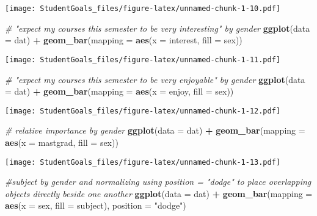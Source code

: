\documentclass[]{article}
\newenvironment{Shaded}{\begin{snugshade}}{\end{snugshade}}
\newcommand{\CommentTok}[1]{\textcolor[rgb]{0.56,0.35,0.01}{\textit{#1}}}
\newcommand{\DataTypeTok}[1]{\textcolor[rgb]{0.13,0.29,0.53}{#1}}
\newcommand{\KeywordTok}[1]{\textcolor[rgb]{0.13,0.29,0.53}{\textbf{#1}}}
\newcommand{\NormalTok}[1]{#1}
\newcommand{\OperatorTok}[1]{\textcolor[rgb]{0.81,0.36,0.00}{\textbf{#1}}}
\newcommand{\StringTok}[1]{\textcolor[rgb]{0.31,0.60,0.02}{#1}}
\begin{document}
\texttt{[image: StudentGoals\_files/figure-latex/unnamed-chunk-1-10.pdf]}

\begin{Shaded}
\begin{Highlighting}[]
\CommentTok{# "expect my courses this semester to be very interesting" by gender}
\KeywordTok{ggplot}\NormalTok{(}\DataTypeTok{data =}\NormalTok{ dat) }\OperatorTok{+}\StringTok{ }
\StringTok{  }\KeywordTok{geom_bar}\NormalTok{(}\DataTypeTok{mapping =} \KeywordTok{aes}\NormalTok{(}\DataTypeTok{x =}\NormalTok{ interest, }\DataTypeTok{fill =}\NormalTok{ sex))}
\end{Highlighting}
\end{Shaded}

\texttt{[image: StudentGoals\_files/figure-latex/unnamed-chunk-1-11.pdf]}

\begin{Shaded}
\begin{Highlighting}[]
\CommentTok{# "expect my courses this semester to be very enjoyable" by gender}
\KeywordTok{ggplot}\NormalTok{(}\DataTypeTok{data =}\NormalTok{ dat) }\OperatorTok{+}\StringTok{ }
\StringTok{  }\KeywordTok{geom_bar}\NormalTok{(}\DataTypeTok{mapping =} \KeywordTok{aes}\NormalTok{(}\DataTypeTok{x =}\NormalTok{ enjoy, }\DataTypeTok{fill =}\NormalTok{ sex))}
\end{Highlighting}
\end{Shaded}

\texttt{[image: StudentGoals\_files/figure-latex/unnamed-chunk-1-12.pdf]}

\begin{Shaded}
\begin{Highlighting}[]
\CommentTok{# relative importance by gender}
\KeywordTok{ggplot}\NormalTok{(}\DataTypeTok{data =}\NormalTok{ dat) }\OperatorTok{+}\StringTok{ }
\StringTok{  }\KeywordTok{geom_bar}\NormalTok{(}\DataTypeTok{mapping =} \KeywordTok{aes}\NormalTok{(}\DataTypeTok{x =}\NormalTok{ mastgrad, }\DataTypeTok{fill =}\NormalTok{ sex))}
\end{Highlighting}
\end{Shaded}

\texttt{[image: StudentGoals\_files/figure-latex/unnamed-chunk-1-13.pdf]}

\begin{Shaded}
\begin{Highlighting}[]
\CommentTok{#subject by gender and normalizing using position = "dodge" to place overlapping objects directly beside one another}
\KeywordTok{ggplot}\NormalTok{(}\DataTypeTok{data =}\NormalTok{ dat) }\OperatorTok{+}\StringTok{ }
\StringTok{  }\KeywordTok{geom_bar}\NormalTok{(}\DataTypeTok{mapping =} \KeywordTok{aes}\NormalTok{(}\DataTypeTok{x =}\NormalTok{ sex, }\DataTypeTok{fill =}\NormalTok{ subject), }\DataTypeTok{position =} \StringTok{"dodge"}\NormalTok{)}
\end{Highlighting}
\end{Shaded}
\end{document}
